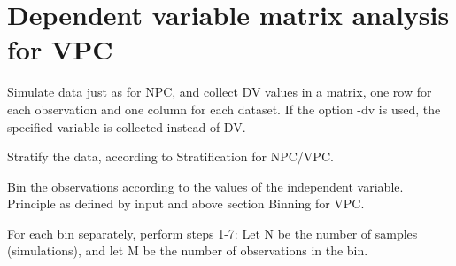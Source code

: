 \section{Dependent variable matrix analysis for VPC}
Simulate data just as for NPC, and collect DV values in a matrix, one row for each observation and one column for each dataset. If the option -dv is used, the specified variable is collected instead of DV.

Stratify the data, according to Stratification for NPC/VPC.

Bin the observations according to the values of the independent variable. Principle as defined by input and above section Binning for VPC.

For each bin separately, perform steps 1-7: 
Let N be the number of samples (simulations), and let M be the number of observations in the bin.

